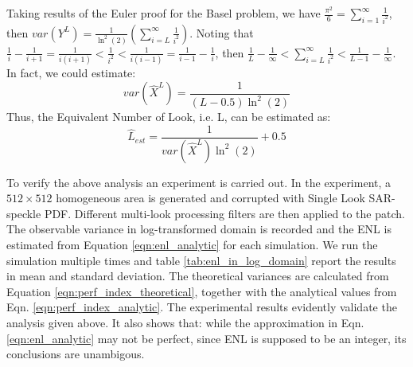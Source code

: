 \documentclass[journal]{IEEEtran}
\begin{document}
Taking results of the Euler proof for the Basel problem, we have $\frac{\pi^2}{6} = \sum^{\infty}_{i=1}{ \frac{1}{i^2} } $, then $var(Y^L)= \frac{1}{\ln^2(2)} \left( \sum^{\infty}_{i=L}{ \frac{1}{i^2} } \right) $.
Noting that $ \frac{1}{i} - \frac{1}{i+1} = \frac{1}{i(i+1)} < \frac{1}{i^2} < \frac{1}{i(i-1)} = \frac{1}{i-1} - \frac{1}{i}$, then $ \frac{1}{L} - \frac{1}{\infty} < \sum^{\infty}_{i=L}{ \frac{1}{i^2} }  < \frac{1}{L-1} - \frac{1}{\infty} $.
In fact, we could estimate:
\begin{equation}
  var(\hat{X}^L) = \frac{1}{(L-0.5) \ln^2(2) }
\label{eqn:perf_index_analytic}
\end{equation}
Thus, the Equivalent Number of Look, i.e. L, can be estimated as:
\begin{equation}
\hat{L}_{est} = \frac{1}{var(\hat{X}^L) \ln^2(2)} + 0.5
\label{eqn:enl_analytic}
\end{equation}

To verify the above analysis an experiment is carried out.
In the experiment, a $512\times512$ homogeneous area is generated and corrupted with Single Look SAR-speckle PDF. 
Different multi-look processing filters are then applied to the patch. 
The observable variance in log-transformed domain is recorded and 
	the ENL is estimated from Equation \ref{eqn:enl_analytic} for each simulation.
We run the simulation multiple times and table \ref{tab:enl_in_log_domain} report the results in mean and standard deviation.
The theoretical variances are calculated from Equation \ref{eqn:perf_index_theoretical}, 
	together with the analytical values from Eqn. \ref{eqn:perf_index_analytic}.
The experimental results evidently validate the analysis given above.
It also shows that: 
	while the approximation in Eqn. \ref{eqn:enl_analytic} may not be perfect, 
	since ENL is supposed to be an integer, its conclusions are unambigous.
\end{document}
